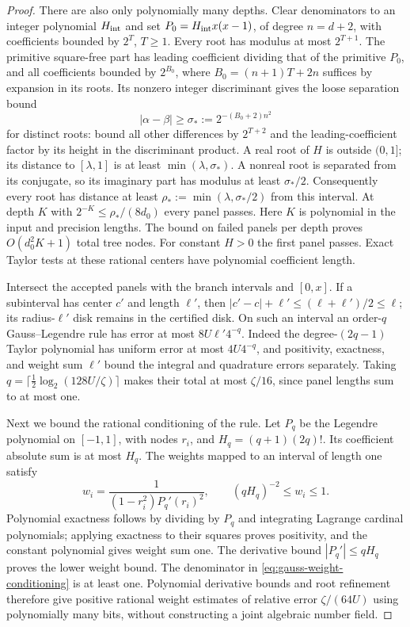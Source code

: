\begin{proof}
There are also only polynomially many depths. Clear denominators to
an integer polynomial $H_{\rm int}$ and set
$P_0=H_{\rm int}x(x-1)$, of degree $n=d+2$, with coefficients
bounded by $2^T$, $T\ge1$. Every root has modulus at most $2^{T+1}$.
The primitive square-free part has leading coefficient dividing that
of the primitive $P_0$, and all coefficients bounded by $2^{B_0}$,
where $B_0=(n+1)T+2n$ suffices by expansion in its roots. Its nonzero
integer discriminant gives the loose separation bound
\[
 |\alpha-\beta|\ge\sigma_*:=2^{-(B_0+2)n^2}
\]
for distinct roots: bound all other differences by $2^{T+2}$ and the
leading-coefficient factor by its height in the discriminant product.
A real root of $H$ is outside $(0,1]$; its distance to $[\lambda,1]$
is at least $\min(\lambda,\sigma_*)$. A nonreal root is separated
from its conjugate, so its imaginary part has modulus at least
$\sigma_*/2$. Consequently every root has distance at least
$\rho_*:=\min(\lambda,\sigma_*/2)$ from this interval.
At depth $K$ with $2^{-K}\le\rho_*/(8d_0)$ every panel passes.
Here $K$ is polynomial in the input and precision lengths. The bound
on failed panels per depth proves $O(d_0^2K+1)$ total tree nodes.
For constant $H>0$ the first panel passes. Exact Taylor tests at these
rational centers have polynomial coefficient length.

Intersect the accepted panels with the branch intervals and $[0,x]$.
If a subinterval has center $c'$ and length $\ell'$, then
$|c'-c|+\ell'\le(\ell+\ell')/2\le\ell$; its radius-$\ell'$ disk
remains in the certified disk. On such an interval an order-$q$
Gauss--Legendre rule has error at most $8U\ell'4^{-q}$.
Indeed the degree-$(2q-1)$ Taylor polynomial has uniform error at
most $4U4^{-q}$, and positivity, exactness, and weight sum $\ell'$
bound the integral and quadrature errors separately. Taking
$q=\lceil\frac12\log_2(128U/\zeta)\rceil$ makes their total at
most $\zeta/16$, since panel lengths sum to at most one.

Next we bound the rational conditioning of the rule. Let $P_q$ be the
Legendre polynomial on $[-1,1]$, with nodes $r_i$, and
$H_q=(q+1)(2q)!$. Its coefficient absolute sum is at most $H_q$.
The weights mapped to an interval of length one satisfy
\begin{equation}\label{eq:gauss-weight-conditioning}
 w_i=\frac1{(1-r_i^2)P_q'(r_i)^2},\qquad
 (qH_q)^{-2}\le w_i\le1.
\end{equation}
Polynomial exactness follows by dividing by $P_q$ and integrating
Lagrange cardinal polynomials; applying exactness to their squares
proves positivity, and the constant polynomial gives weight sum one.
The derivative bound $|P_q'|\le qH_q$ proves the lower weight bound.
The denominator in \eqref{eq:gauss-weight-conditioning} is at least
one. Polynomial derivative bounds and root refinement therefore give
positive rational weight estimates of relative error
$\zeta/(64U)$ using polynomially many bits, without constructing a
joint algebraic number field.


\end{proof}

